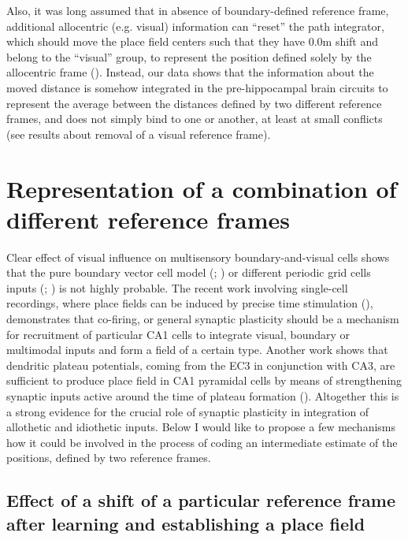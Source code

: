 Also, it was long assumed that in absence of boundary-defined reference frame, additional allocentric (e.g. visual) information can “reset” the path integrator, which should move the place field centers such that they have 0.0m shift and belong to the “visual” group, to represent the position defined solely by the allocentric frame (\cite{Savelli2008}). Instead, our data shows that the information about the moved distance is somehow integrated in the pre-hippocampal brain circuits to represent the average between the distances defined by two different reference frames, and does not simply bind to one or another, at least at small conflicts (see results about removal of a visual reference frame).


\section{Representation of a combination of different reference frames}
\label{sec:integration_two_frames}

Clear effect of visual influence on multisensory boundary-and-visual cells shows that the pure boundary vector cell model (\cite{Barry2006}; \cite{Grieves2018}) or different periodic grid cells inputs (\cite{OKeefe2005}; \cite{Rolls2006}) is not highly probable. The recent work involving single-cell recordings, where place fields can be induced by precise time stimulation (\cite{Zhao2020}), demonstrates that co-firing, or general synaptic plasticity should be a mechanism for recruitment of particular CA1 cells to integrate visual, boundary or multimodal inputs and form a field of a certain type. Another work shows that dendritic plateau potentials, coming from the EC3 in conjunction with CA3, are sufficient to produce place field in CA1 pyramidal cells by means of strengthening synaptic inputs active around the time of plateau formation (\cite{Bittner2015}). Altogether this is a strong evidence for the crucial role of synaptic plasticity in integration of allothetic and idiothetic inputs. Below I would like to propose a few mechanisms how it could be involved in the process of coding an intermediate estimate of the positions, defined by two reference frames.


\subsection{Effect of a shift of a particular reference frame after learning and establishing a place field}

